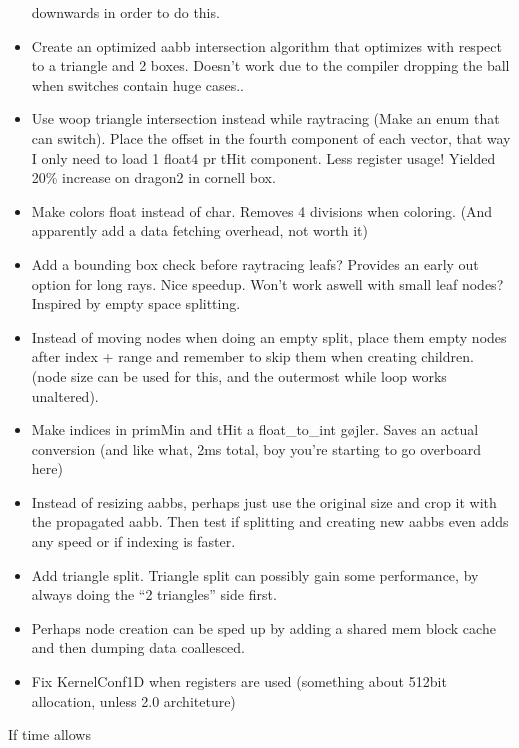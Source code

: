 \begin{itemize}
  downwards in order to do this.
\item Create an optimized aabb intersection algorithm that
optimizes with respect to a triangle and 2 boxes. Doesn't work due to
the compiler dropping the ball when switches contain huge cases..
\item Use woop triangle intersection instead while raytracing (Make an
  enum that can switch). Place the offset in the fourth component of
  each vector, that way I only need to load 1 float4 pr tHit
  component. Less register usage! Yielded 20\% increase on dragon2 in
  cornell box.
\item Make colors float instead of char. Removes 4 divisions when
  coloring. (And apparently add a data fetching overhead, not worth
  it)
\item Add a bounding box check before raytracing leafs? Provides an
  early out option for long rays. Nice speedup. Won't work aswell with
  small leaf nodes? Inspired by empty space splitting.
\item Instead of moving nodes when doing an empty split, place them
  empty nodes after index + range and remember to skip them when
  creating children. (node size can be used for this, and the
  outermost while loop works unaltered).

\color{red}
\item Make indices in primMin and tHit a float\_to\_int gøjler. Saves
  an actual conversion (and like what, 2ms total, boy you're starting
  to go overboard here)
\item Instead of resizing aabbs, perhaps just use the original size
  and crop it with the propagated aabb. Then test if splitting and
  creating new aabbs even adds any speed or if indexing is faster.
\item Add triangle split. Triangle split can possibly gain
  some performance, by always doing the ``2 triangles'' side first.
\item Perhaps node creation can be sped up by adding a shared mem
  block cache and then dumping data coallesced.
\item Fix KernelConf1D when registers are used (something about 512bit
  allocation, unless 2.0 architeture)
\end{itemize}

If time allows

